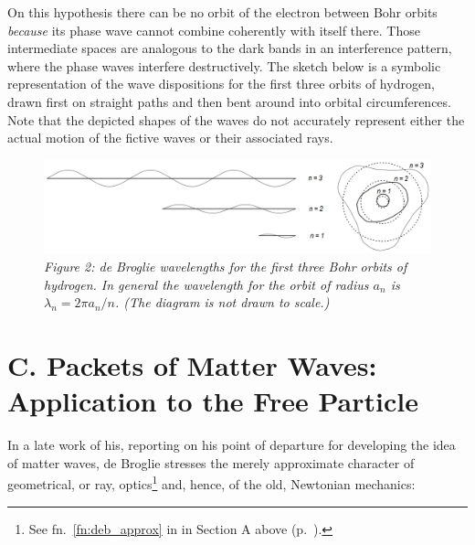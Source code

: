 On this hypothesis there can be no orbit of the electron between Bohr
orbits \emph{because} its phase wave cannot combine coherently with
itself there. Those intermediate spaces are analogous to the dark bands
in an interference pattern, where the phase waves interfere
destructively. The sketch below is a symbolic representation of the wave
dispositions for the first three orbits of hydrogen, drawn first on
straight paths and then bent around into orbital circumferences. Note
that the depicted shapes of the waves do not accurately represent either
the actual motion of the fictive waves or their associated rays.

\begin{figure}[h] %
  \begin{center}
    \includegraphics[width=\textwidth]{images/08_debroglie/standing-waves.png}
  \end{center}
  \caption*{\emph{Figure 2: de Broglie wavelengths for the first three Bohr orbits of
     hydrogen. In general the wavelength for the orbit of radius $a_n$ is
     $\lambda_n = 2\pi a_n/n$. (The diagram is not drawn to scale.)}}
\end{figure}



\section*{C. Packets of Matter Waves: Application to the Free Particle }\label{SecC}

In a late work of his, reporting on his point of departure for
developing the idea of matter waves, de Broglie stresses the merely
approximate character of geometrical, or ray, optics\footnote{See fn.~\ref{fn:deb_approx} in
  in Section A above (p.~\pageref{fn:deb_approx}).} and, hence, of the old, Newtonian mechanics:

